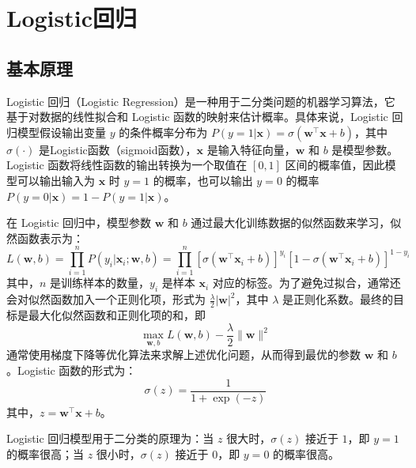 \documentclass[a4paper,12pt,onecolumn,oneside]{article}
\begin{document}
\clearpage
\section{Logistic回归}
\subsection{基本原理}
Logistic 回归（Logistic Regression）是一种用于二分类问题的机器学习算法，它基于对数据的线性拟合和 Logistic 函数的映射来估计概率。具体来说，Logistic 回归模型假设输出变量 $y$ 的条件概率分布为 $P(y=1|\mathbf{x})=\sigma(\mathbf{w}^\top \mathbf{x}+b)$，其中 $\sigma(\cdot)$ 是Logistic函数（sigmoid函数），$\mathbf{x}$ 是输入特征向量，$\mathbf{w}$ 和 $b$ 是模型参数。Logistic 函数将线性函数的输出转换为一个取值在 $[0, 1]$ 区间的概率值，因此模型可以输出输入为 $\mathbf{x}$ 时 $y=1$ 的概率，也可以输出 $y=0$ 的概率 $P(y=0|\mathbf{x})=1-P(y=1|\mathbf{x})$。\par 

在 Logistic 回归中，模型参数 $\mathbf{w}$ 和 $b$ 通过最大化训练数据的似然函数来学习，似然函数表示为：
\begin{equation*}
	L(\mathbf{w},b) = \prod_{i=1}^n P(y_i|\mathbf{x}_i;\mathbf{w},b) = \prod_{i=1}^n [\sigma(\mathbf{w}^\top \mathbf{x}_i+b)]^{y_i}[1-\sigma(\mathbf{w}^\top \mathbf{x}_i+b)]^{1-y_i}
\end{equation*}
其中，$n$ 是训练样本的数量，$y_i$ 是样本 $\mathbf{x}_i$ 对应的标签。为了避免过拟合，通常还会对似然函数加入一个正则化项，形式为 $\frac{\lambda}{2}|\mathbf{w}|^2$，其中 $\lambda$ 是正则化系数。最终的目标是最大化似然函数和正则化项的和，即
\begin{equation*}
	\max_{\mathbf{w},b} L(\mathbf{w},b) - \frac{\lambda}{2}\|\mathbf{w}\|^2
\end{equation*}
通常使用梯度下降等优化算法来求解上述优化问题，从而得到最优的参数 $\mathbf{w}$ 和 $b$。Logistic 函数的形式为：
\begin{equation*}
	\sigma(z) = \frac{1}{1+\exp(-z)}
\end{equation*}
其中，$z=\mathbf{w}^\top \mathbf{x}+b$。\par 
Logistic 回归模型用于二分类的原理为：当 $z$ 很大时，$\sigma(z)$ 接近于 $1$，即 $y=1$ 的概率很高；当 $z$ 很小时，$\sigma(z)$ 接近于 $0$，即 $y=0$ 的概率很高。
\end{document}
